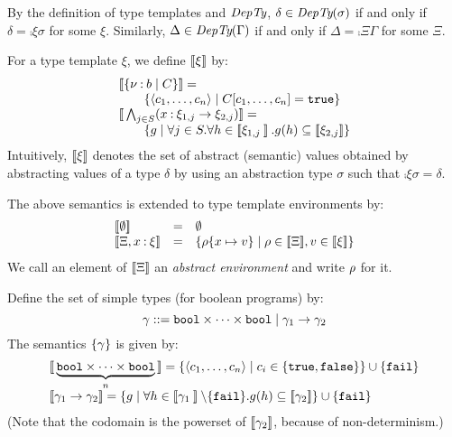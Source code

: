 By the definition of type templates and \(\textit{DepTy}\), 
\(\delta\in \textit{DepTy}(\sigma)\) if and only if \(\delta = \comp{\xi}{\sigma}\) for some \(\xi\).
Similarly, \(\Delta\in \textit{DepTy}(\Gamma)\) if and only if
\(\Delta = \comp{\Xi}{\Gamma}\) for some \(\Xi\).

For a type template \(\xi\),
we define \(\mathbin{[\![}\xi\mathbin{]\!]}\) by:
\[
\begin{array}{l}
\sem{\rtbase{\dvar}{b}{C}}=\\
\qquad  \set{\tuple{c_1,\ldots,c_n} \mid C[c_1,\ldots,c_n]=\TRUE}\\
\sem{\dtI_{j\in S}(\rtfun{x\COL\xi_{1,j}}{\xi_{2,j}})} = \\ %
\qquad \set{g \mid \forall j\in S.\forall h\in \sem{\xi_{1,j}}.g(h) \subseteq \sem{\xi_{2,j}}}
\end{array}
\]
Intuitively, \(\mathbin{[\![}\xi\mathbin{]\!]}\) denotes the set of abstract (semantic) values obtained by 
abstracting values of a type \(\delta\) by using an abstraction type \(\sigma\) such that \(\comp{\xi}{\sigma}=\delta\).

The above semantics is extended to type template environments by:
\[
\begin{array}{lcl}
\sem{\emptyset} &=& \emptyset\\
\sem{\Xi, x\COL\xi} &=&
  \set{\rho\set{x\mapsto v} \mid \rho\in \sem{\Xi}, v\in \sem{\xi}}
\end{array}
\]
We call an element of \(\mathbin{[\![}\Xi\mathbin{]\!]}\) an \emph{abstract environment} and write \(\rho\) for it.


Define the set of simple types (for boolean programs) by:
\[ \gamma ::= \mathtt{bool}\times\cdots \times \mathtt{bool} \mid \gamma_1 \rightarrow \gamma_2\]
The semantics \(\{\gamma\}\) is given by:
\[
\begin{array}{l}
\sem{\underbrace{\TBOOL\times \cdots \times \TBOOL}_n} =
\set{ \tuple{c_1,\ldots,c_n}\mid c_i\in\set{\TRUE,\FALSE}}\cup \set{\FAIL}\\
\sem{\st_1\ra \st_2} =
  \set{g \mid \forall h\in\sem{\st_1}\setminus\set{\FAIL}.g(h)\subseteq \sem{\st_2}}\cup\set{\FAIL}
\end{array}
\]
(Note that the codomain is the powerset of \(\mathbin{[\![}\gamma_2\mathbin{]\!]}\), because of non-determinism.)

